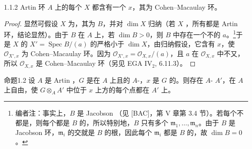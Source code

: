 \begin{SGAresult}{}{1.1.2}
Artin 环 $A$ 上的每个 $X$ 都含有一个 $x$，其为 Cohen--Macaulay 环。
\end{SGAresult}
\begin{proof}
显然可假设 $X$ 为，其为 $B$，并对 $\dim X$ 归纳（若 $X$ ，所有都是 Artin 环，结论显然）。由于 $B$ 在 $A$ 上，若 $\dim B>0$，则 $B$ 中存在一个不的 $a$。\footnote{编者注：事实上，$B$ 是 Jacobson （见 [BAC]，第 V 章第 3.4 节）。若每个不都是，则每个都是 $B$ 的，所以特别地，$B$ 只有多个 $\mathfrak m_1,\ldots,\mathfrak m_n$。由于 $B$ 是 Jacobson 环，$\mathfrak m_i$ 的交就是 $B$ 的根，因此每个 $\mathfrak m_i$ 都是 $B$ 的，故 $\dim B=0$。}于是 $X$ 的 $X'=\operatorname{Spec}B/(a)$ 的严格小于 $\dim X$，由归纳假设，它含有 $x$，使 $\mathcal O_{X',x}$ 为 Cohen--Macaulay 环。因为 $\mathcal O_{X',x}=\mathcal O_{X,x}/(a)$，且 $a$ 在 $\mathcal O_{X,x}$ 中不又，所以 $\mathcal O_{X,x}$ 是 Cohen--Macaulay 环（另见 EGA IV$_2$, 6.11.3）。
\end{proof}
\begin{SGAresult}{命题}{1.2}
设 $A$ 是 Artin ，$G$ 是在 $A$ 上且的 $A$-，$x$ 是 $G$ 的。则存在 $A$- $A'$，在 $A$ 上自由，使 $G\otimes_A A'$ 中位于 $x$ 上方的每个点都在 $A'$ 上。
\end{SGAresult}
